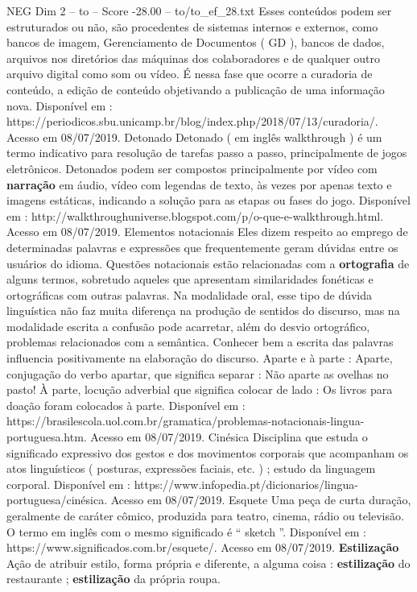 \begin{textsample}{NEG Dim 2 – to – Score -28.00 – to/to\_ef\_28.txt}
Esses conteúdos podem ser estruturados ou não, são procedentes de sistemas internos e externos, como bancos de imagem, Gerenciamento de Documentos ( GD ), bancos de dados, arquivos nos diretórios das máquinas dos colaboradores e de qualquer outro arquivo digital como som ou vídeo.
É nessa fase que ocorre a curadoria de conteúdo, a edição de conteúdo objetivando a publicação de uma informação nova.
Disponível em : https://periodicos.sbu.unicamp.br/blog/index.php/2018/07/13/curadoria/.
Acesso em 08/07/2019.
Detonado Detonado ( em inglês walkthrough ) é um termo indicativo para resolução de tarefas passo a passo, principalmente de jogos eletrônicos.
Detonados podem ser compostos principalmente por vídeo com \textbf{narração} em áudio, vídeo com legendas de texto, às vezes por apenas texto e imagens estáticas, indicando a solução para as etapas ou fases do jogo.
Disponível em : http://walkthroughuniverse.blogspot.com/p/o-que-e-walkthrough.html.
Acesso em 08/07/2019.
Elementos notacionais Eles dizem respeito ao emprego de determinadas palavras e expressões que frequentemente geram dúvidas entre os usuários do idioma.
Questões notacionais estão relacionadas com a \textbf{ortografia} de alguns termos, sobretudo aqueles que apresentam similaridades fonéticas e ortográficas com outras palavras.
Na modalidade oral, esse tipo de dúvida linguística não faz muita diferença na produção de sentidos do discurso, mas na modalidade escrita a confusão pode acarretar, além do desvio ortográfico, problemas relacionados com a semântica.
Conhecer bem a escrita das palavras influencia positivamente na elaboração do discurso.
Aparte e à parte : Aparte, conjugação do verbo apartar, que significa separar : Não aparte as ovelhas no pasto!
À parte, locução adverbial que significa colocar de lado : Os livros para doação foram colocados à parte.
Disponível em : https://brasilescola.uol.com.br/gramatica/problemas-notacionais-lingua-portuguesa.htm.
Acesso em 08/07/2019.
Cinésica Disciplina que estuda o significado expressivo dos gestos e dos movimentos corporais que acompanham os atos linguísticos ( posturas, expressões faciais, etc. ) ; estudo da linguagem corporal.
Disponível em : https://www.infopedia.pt/dicionarios/lingua-portuguesa/cinésica.
Acesso em 08/07/2019.
Esquete Uma peça de curta duração, geralmente de caráter cômico, produzida para teatro, cinema, rádio ou televisão.
O termo em inglês com o mesmo significado é “ sketch ”.
Disponível em : https://www.significados.com.br/esquete/.
Acesso em 08/07/2019. \textbf{Estilização} Ação de atribuir estilo, forma própria e diferente, a alguma coisa : \textbf{estilização} do restaurante ; \textbf{estilização} da própria roupa.

\end{textsample}
